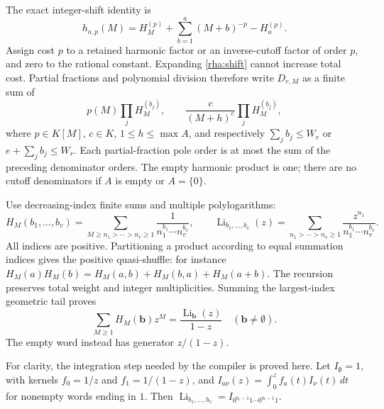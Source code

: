 The exact integer-shift identity is
\begin{equation}\label{rha:shift}
 h_{a,p}(M)=H_M^{(p)}+\sum_{b=1}^{a}(M+b)^{-p}-H_a^{(p)}.
\end{equation}
Assign cost $p$ to a retained harmonic factor or an inverse-cutoff
factor of order $p$, and zero to the rational constant. Expanding
\eqref{rha:shift} cannot increase total cost. Partial fractions and
polynomial division therefore write $D_{r,M}$ as a finite sum of
\begin{equation}\label{rha:cutoff}
 p(M)\prod_jH_M^{(b_j)},\qquad
 \frac{c}{(M+h)^e}\prod_jH_M^{(b_j)},
\end{equation}
where $p\in K[M]$, $c\in K$, $1\le h\le\max A$, and respectively
$\sum_jb_j\le W_r$ or $e+\sum_jb_j\le W_r$.
Each partial-fraction pole order is at most the sum of the preceding
denominator orders. The empty harmonic product is one; there are no
cutoff denominators if $A$ is empty or $A=\{0\}$.

Use decreasing-index finite sums and multiple polylogarithms:
\[
 H_M(b_1,\ldots,b_v)=\sum_{M\ge n_1>\cdots>n_v\ge1}
             \frac{1}{n_1^{b_1}\cdots n_v^{b_v}},\qquad
 \operatorname{Li}_{b_1,\ldots,b_v}(z)=
       \sum_{n_1>\cdots>n_v\ge1}
             \frac{z^{n_1}}{n_1^{b_1}\cdots n_v^{b_v}}.
\]
All indices are positive. Partitioning a product according to equal
summation indices gives the positive quasi-shuffle: for instance
$H_M(a)H_M(b)=H_M(a,b)+H_M(b,a)+H_M(a+b)$.
The recursion preserves total weight and integer multiplicities.
Summing the largest-index geometric tail proves
\begin{equation}\label{rha:hgen}
 \sum_{M\ge1}H_M(\mathbf b)z^M
       =\frac{\operatorname{Li}_{\mathbf b}(z)}{1-z}
                    \quad(\mathbf b\ne\emptyset).
\end{equation}
The empty word instead has generator $z/(1-z)$.

For clarity, the integration step needed by the compiler is proved here.
Let $I_\emptyset=1$, with kernels $f_0=1/z$ and $f_1=1/(1-z)$,
and $I_{a\nu}(z)=\int_0^z f_a(t)I_\nu(t)\,dt$ for nonempty words
ending in $1$. Then
$\operatorname{Li}_{b_1,\ldots,b_v}=I_{0^{b_1-1}1\cdots0^{b_v-1}1}$.

